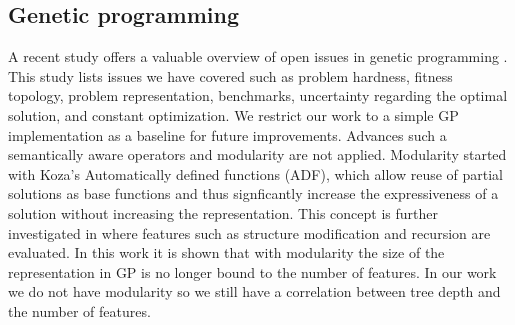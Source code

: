 \subsection{Genetic programming}
A recent study offers a valuable overview of open issues in genetic programming \citep{GPIssues}. This study lists issues we have covered such as problem hardness, fitness topology, problem representation, benchmarks, uncertainty regarding the optimal solution, and constant optimization.
We restrict our work to a simple GP implementation as a baseline for future improvements. Advances such a semantically aware operators \citep {GPSemantics} and modularity are not applied. Modularity started with Koza's \cite{GP} Automatically defined functions (ADF), which allow reuse of partial solutions as base functions and thus signficantly increase the expressiveness of a solution without increasing the representation. This concept is further investigated in \citep{GPModularity} where features such as structure modification and recursion are evaluated. In this work it is shown that with modularity the size of the representation in GP is no longer bound to the number of features. In our work we do not have modularity so we still have a correlation between tree depth and the number of features.

